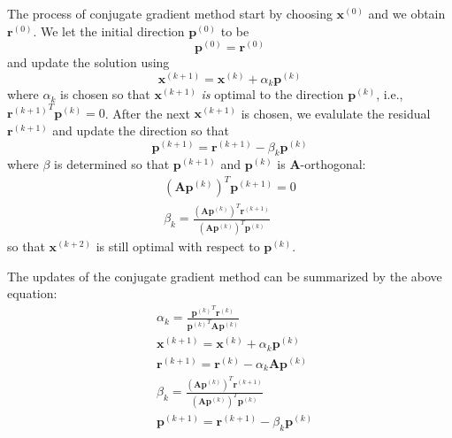 \documentclass{article}
\begin{document}
The process of conjugate gradient method start by choosing $\mathbf{x}^{(0)}$ and 
we obtain $\mathbf{r}^{(0)}$. We let the initial direction $\mathbf{p}^{(0)}$ to be 
\[\mathbf{p}^{(0)} = \mathbf{r}^{(0)}\]
and update the solution using
\begin{equation}
    \mathbf{x}^{(k+1)} = \mathbf{x}^{(k)} + \alpha_k \mathbf{p}^{(k)}
\end{equation}
where $\alpha_k$ is chosen so that $\mathbf{x}^{(k+1)}$ \emph{is} optimal to the 
direction $\mathbf{p}^{(k)}$, i.e., $\left.\mathbf{r}^{(k+1)}\right.^T \mathbf{p}^{(k)} = 0$.
After the next $\mathbf{x}^{(k+1)}$ is chosen, we evalulate the residual $\mathbf{r}^{(k+1)}$
and update the direction so that
\begin{equation}
    \mathbf{p}^{(k+1)} = \mathbf{r}^{(k+1)} - \beta_k \mathbf{p}^{(k)}
\end{equation}
where $\beta$ is determined so that $\mathbf{p}^{(k+1)}$ and $\mathbf{p}^{(k)}$
is $\mathbf{A}$-orthogonal:
\begin{gather}
    \left(\mathbf{A} \mathbf{p}^{(k)} \right)^T \mathbf{p}^{(k+1)} = 0 \\
    \beta_k = \frac{\left(\mathbf{A} \mathbf{p}^{(k)} \right)^T \mathbf{r}^{(k+1)}}{\left(\mathbf{A} \mathbf{p}^{(k)} \right)^T \mathbf{p}^{(k)}}
\end{gather}
so that $\mathbf{x}^{(k+2)}$ is still optimal with respect to $\mathbf{p}^{(k)}$. 

The updates of the conjugate gradient method can be summarized by the above equation:
\begin{align*}
    & \alpha_k = 
    \frac{\left.\mathbf{p}^{(k)}\right.^T \mathbf{r}^{(k)}}
    {\left.\mathbf{p}^{(k)}\right.^T \mathbf{A} \mathbf{p}^{(k)}} \\
    & \mathbf{x}^{(k+1)} = \mathbf{x}^{(k)} + \alpha_k \mathbf{p}^{(k)} \\
    & \mathbf{r}^{(k+1)} = \mathbf{r}^{(k)} - \alpha_k \mathbf{A}\mathbf{p}^{(k)} \\
    & \beta_k = \frac{\left(\mathbf{A} \mathbf{p}^{(k)} \right)^T \mathbf{r}^{(k+1)}}{\left(\mathbf{A} \mathbf{p}^{(k)} \right)^T \mathbf{p}^{(k)}} \\
    & \mathbf{p}^{(k+1)} = \mathbf{r}^{(k+1)} - \beta_k \mathbf{p}^{(k)}
\end{align*}
\end{document}
